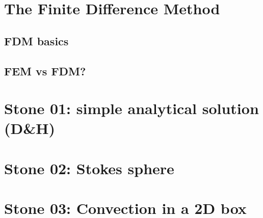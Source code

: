 \documentclass[a4paper]{article}
\begin{document}
\newpage
\section{The Finite Difference Method}

\subsection{FDM basics} \label{ss:fdm_basics}  
\subsection{FEM vs FDM?}\label{ss:femvsfdm}   




\newpage %
\section*{
Stone 01: simple analytical solution (D\&H) 
\label{f01}}

\newpage %
\section*{
Stone 02: Stokes sphere 
\label{f02}}

\newpage %
\section*{
Stone 03: Convection in a 2D box 
\label{f03}}
\end{document}
